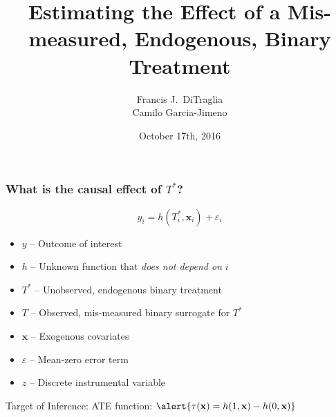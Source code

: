 \documentclass{beamer}
\title[Binary Regressors]{Estimating the Effect of a Mis-measured, Endogenous, Binary Treatment}
\author[FJ DiTraglia]{Francis J.\ DiTraglia\\ Camilo Garcia-Jimeno}
\institute{University of Pennsylvania}
\date{October 17th, 2016}
\begin{document}
 

\begin{frame}[plain]
	\titlepage 
\end{frame} 
\begin{frame}
  \frametitle{What is the causal effect of $T^*$?}
  \vspace{-1em}
  \[ y_i = h(T^*_i, \mathbf{x}_i) + \varepsilon_i\]
  \vspace{-1.5em}
  \begin{itemize}
    \item $y$ -- Outcome of interest
    \item $h$ -- Unknown function that \emph{does not depend on} $i$
    \item $T^*$ -- Unobserved, endogenous binary treatment
    \item $T$ -- Observed, mis-measured binary surrogate for $T^*$
    \item $\mathbf{x}$ -- Exogenous covariates
    \item $\varepsilon$ -- Mean-zero error term
    \item $z$ -- Discrete instrumental variable
  \end{itemize}

 \begin{block}{Target of Inference:}
   ATE function:  $\alert{\tau(\mathbf{x}) = h(1,\mathbf{x}) - h(0,\mathbf{x})}$
  \end{block}
\end{frame}
%   
\end{document}
